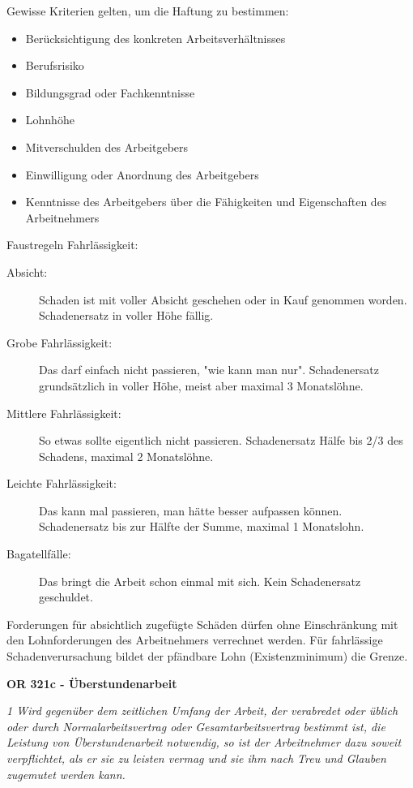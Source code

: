 Gewisse Kriterien gelten, um die Haftung zu bestimmen:

\begin{itemize}
  \item Berücksichtigung des konkreten Arbeitsverhältnisses
  \item Berufsrisiko
  \item Bildungsgrad oder Fachkenntnisse
  \item Lohnhöhe
  \item Mitverschulden des Arbeitgebers
  \item Einwilligung oder Anordnung des Arbeitgebers
  \item Kenntnisse des Arbeitgebers über die Fähigkeiten und Eigenschaften des Arbeitnehmers
\end{itemize}

Faustregeln Fahrlässigkeit:
\begin{description}
  \item[Absicht:] Schaden ist mit voller Absicht geschehen oder in Kauf genommen worden. Schadenersatz in voller Höhe fällig.
  \item[Grobe Fahrlässigkeit:] Das darf einfach nicht passieren, "wie kann man nur". Schadenersatz grundsätzlich in voller Höhe, meist aber maximal 3 Monatslöhne.
  \item[Mittlere Fahrlässigkeit:] So etwas sollte eigentlich nicht passieren. Schadenersatz Hälfe bis 2/3 des Schadens, maximal 2 Monatslöhne.
  \item[Leichte Fahrlässigkeit:] Das kann mal passieren, man hätte besser aufpassen können. Schadenersatz bis zur Hälfte der Summe, maximal 1 Monatslohn.
  \item[Bagatellfälle:] Das bringt die Arbeit schon einmal mit sich. Kein Schadenersatz geschuldet.     
\end{description}

Forderungen für absichtlich zugefügte Schäden dürfen ohne Einschränkung mit den Lohnforderungen des Arbeitnehmers verrechnet werden. Für fahrlässige Schadenverursachung bildet der pfändbare Lohn (Existenzminimum) die Grenze.
\vspace{3mm}

\textbf{OR 321c - Überstundenarbeit}

\textit{1 Wird gegenüber dem zeitlichen Umfang der Arbeit, der verabredet oder üblich oder durch Normalarbeitsvertrag oder Gesamtarbeitsvertrag bestimmt ist, die Leistung von Überstundenarbeit notwendig, so ist der Arbeitnehmer dazu soweit verpflichtet, als er sie zu leisten vermag und sie ihm nach Treu und Glauben zugemutet werden kann.}

